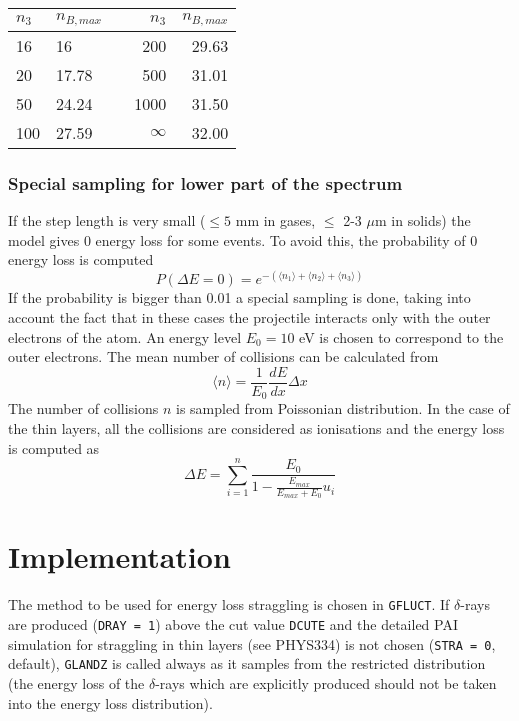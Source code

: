 \begin{tabular}{llcrr}
$n_3$  & $n_{B,max}$ & & $n_3$  & $n_{B,max}$\\ \hline
16   & 16      & & 200  & 29.63\\
20   & 17.78   & & 500  & 31.01 \\
50   & 24.24   & & 1000 & 31.50 \\
100  & 27.59   & & $\infty$ & 32.00
\end{tabular}
\subsubsection{Special sampling for lower part of the spectrum}
If the step length is very small ($\leq 5$ mm in gases, $\leq$ 2-3 $\mu$m
in solids) the model gives 0 energy loss for some events.
To avoid this, the probability of 0 energy loss is computed
\begin{equation}
P( \Delta E=0) = e^{-( \langle n_1 \rangle + \langle n_2 \rangle
                     + \langle n_3 \rangle )}
\end{equation}
If the probability is bigger than 0.01 a special sampling is done,
taking into account the fact that in these cases the projectile
interacts only with the outer electrons of the atom.
An energy level $E_0 = 10$ eV is chosen to correspond to the
outer electrons. The mean number of collisions can be calculated
from 
\begin{equation}
\langle n \rangle = \frac{1}{E_0} \frac{ dE}{dx} \Delta x
\end{equation}
The number of collisions $n$ is sampled from Poissonian
distribution. In the case of the thin layers, all the
collisions are considered as ionisations and the energy loss
is computed as
\begin{equation}
\Delta E = \sum_{i=1}^n \frac{E_0}
          { 1 - \frac {E_{max}}{E_{max} + E_0} u_i}
\end{equation}


\section{Implementation}

The method to be used for energy loss straggling
is chosen in {\tt GFLUCT}. 
If $\delta$-rays are produced ({\tt DRAY = 1})
above the cut value {\tt DCUTE}
and the detailed PAI simulation for straggling 
in thin layers (see PHYS334)
is not chosen ({\tt STRA = 0}, default),
{\tt GLANDZ} is called always as it samples
from the restricted distribution (the energy
loss of the $\delta$-rays which are explicitly
produced should not be taken into the energy
loss distribution).

